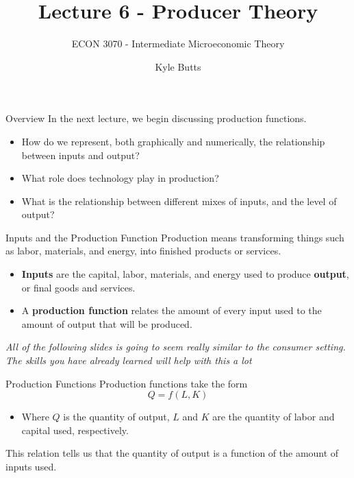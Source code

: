 \documentclass[11pt,t]{beamer}
\author{Kyle Butts}
\title{Lecture 6  - Producer Theory}
\subtitle{ECON 3070 - Intermediate Microeconomic Theory}
\begin{document}
\begin{frame}
  \titlepage
\end{frame}

\begin{frame}{Overview}
  In the next lecture, we begin discussing production functions.
  
  \bigskip
  \begin{itemize}
    \item How do we represent, both graphically and numerically, the relationship between inputs and output?

    \item What role does technology play in production?

    \item What is the relationship between different mixes of inputs, and the level of output?
  \end{itemize}
\end{frame}

\begin{frame}{Inputs and the Production Function}
  Production means transforming things such as labor, materials, and energy, into finished products or services.
  
  \bigskip
  \begin{itemize}
    \item \textbf{Inputs} are the capital, labor, materials, and energy used to produce \textbf{output}, or final goods and services.

    \item A \textbf{production function} relates the amount of every input used to the amount of output that will be produced.
  \end{itemize}

  \pause\bigskip
  \begin{center}
    \emph{All of the following slides is going to seem really similar to the consumer setting. The skills you have already learned will help with this a lot}
  \end{center}
\end{frame}

\begin{frame}{Production Functions}
  Production functions take the form
  \begin{equation*}
    Q=f(L,K)
  \end{equation*}
  
  \bigskip
  \begin{itemize}
    \item Where $Q$ is the quantity of output, $L$ and $K$ are the quantity of labor and capital used, respectively.

  \end{itemize}
  
  \bigskip
  This relation tells us that the quantity of output is a function of the amount of inputs used.
\end{frame}
\end{document}
